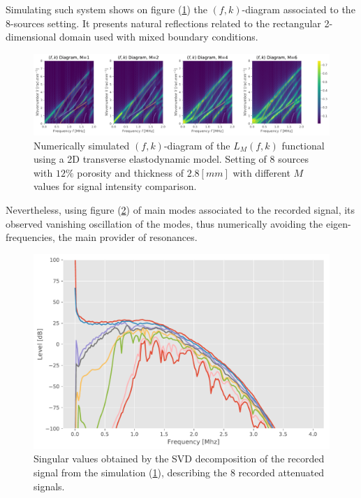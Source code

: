 Simulating such system shows on figure (\ref{FK-DiagramFreqS8P12M28}) the $(f,k)$-diagram associated to the 8-sources setting. It presents natural reflections related to the rectangular 2-dimensional domain used with mixed boundary conditions.
\begin{figure}[!h]
	\centering
	\includegraphics[width=\textwidth]{images/FreqMultSous/2DMixedP12TransIsoFKW28M400_y.pdf}
	\caption{Numerically simulated $(f,k)$-diagram of the $L_M(f,k)$ functional using a 2D transverse elastodynamic model. Setting of 8 sources with $12\%$ porosity and thickness of $2.8 [mm]$ with different $M$ values for signal intensity comparison.}
	\label{FK-DiagramFreqS8P12M28}
\end{figure}

Nevertheless, using figure (\ref{SVD-FreqS8P12M28}) of main modes associated to the recorded signal, its observed vanishing oscillation of the modes, thus numerically avoiding the eigen-frequencies, the main provider of resonances.
\begin{figure}[!h]
	\centering
	\includegraphics[scale=.5]{images/FreqMultSous/2D-FreqSimP12W28eKV_SV.pdf}
	\caption{Singular values obtained by the SVD decomposition of the recorded signal from the simulation (\ref{FK-DiagramFreqS8P12M28}), describing the 8 recorded attenuated signals.}
	\label{SVD-FreqS8P12M28}
\end{figure}


